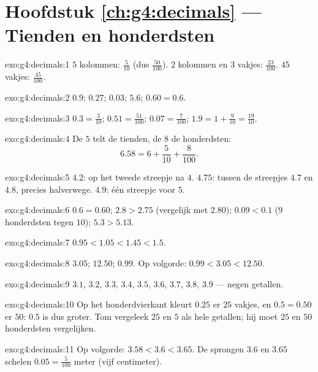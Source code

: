 \section*{Hoofdstuk \ref{ch:g4:decimals} --- Tienden en honderdsten}

\begin{solution}{exo:g4:decimals:1}
$5$ kolommen: $\frac{5}{10}$ (dus $\frac{50}{100}$). $2$ kolommen en $3$
vakjes: $\frac{23}{100}$. $45$ vakjes: $\frac{45}{100}$.
\end{solution}

\begin{solution}{exo:g4:decimals:2}
$0.9$; \quad $0.27$; \quad $0.03$; \quad $5.6$; \quad
$0.60 = 0.6$.
\end{solution}

\begin{solution}{exo:g4:decimals:3}
$0.3 = \frac{3}{10}$; \quad $0.51 = \frac{51}{100}$; \quad
$0.07 = \frac{7}{100}$; \quad $1.9 = 1 + \frac{9}{10} =
\frac{19}{10}$.
\end{solution}

\begin{solution}{exo:g4:decimals:4}
De $5$ telt de tienden, de $8$ de honderdsten:
\[
6.58 = 6 + \frac{5}{10} + \frac{8}{100}.
\]
\end{solution}

\begin{solution}{exo:g4:decimals:5}
$4.2$: op het tweede streepje na $4$. $4.75$: tussen de streepjes $4.7$ en
$4.8$, precies halverwege. $4.9$: één streepje voor $5$.
\end{solution}

\begin{solution}{exo:g4:decimals:6}
$0.6 = 0.60$; \quad $2.8 > 2.75$ (vergelijk met $2.80$); \quad
$0.09 < 0.1$ ($9$ honderdsten tegen $10$); \quad
$5.3 > 5.13$.
\end{solution}

\begin{solution}{exo:g4:decimals:7}
$0.95 < 1.05 < 1.45 < 1.5$.
\end{solution}

\begin{solution}{exo:g4:decimals:8}
$3.05$; \quad $12.50$; \quad $0.99$. Op volgorde:
$0.99 < 3.05 < 12.50$.
\end{solution}

\begin{solution}{exo:g4:decimals:9}
$3.1$, $3.2$, $3.3$, $3.4$, $3.5$, $3.6$, $3.7$, $3.8$, $3.9$ --- negen
getallen.
\end{solution}

\begin{solution}{exo:g4:decimals:10}
Op het honderdvierkant kleurt $0.25$ er $25$ vakjes, en $0.5 = 0.50$ er
$50$: $0.5$ is dus groter. Tom vergeleek $25$ en $5$ als hele getallen; hij
moet $25$ en $50$ honderdsten vergelijken.
\end{solution}

\begin{solution}{exo:g4:decimals:11}
Op volgorde: $3.58 < 3.6 < 3.65$. De sprongen $3.6$ en $3.65$ schelen
$0.05 = \frac{5}{100}$ meter (vijf centimeter).
\end{solution}
